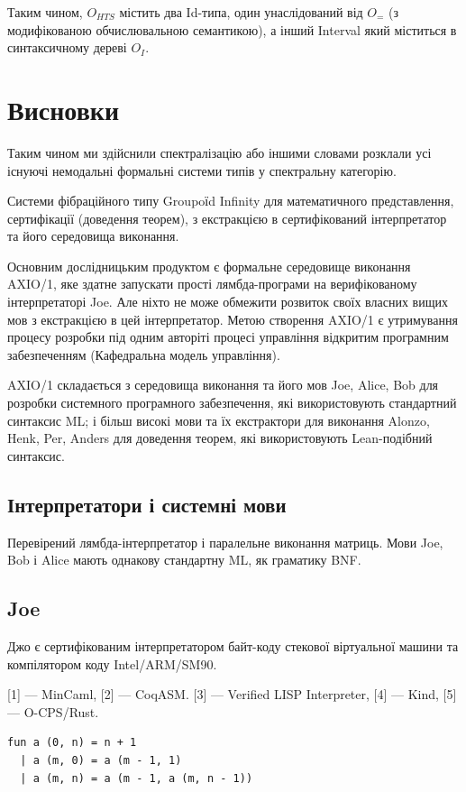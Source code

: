Таким чином,
$O_{HTS}$ містить два Id-типа, один унаслідований від $O_=$ (з модифікованою
обчислювальною семантикою), а інший Interval який міститься в синтаксичному дереві $O_I$.

\newpage
\section{Висновки}

Таким чином ми здійснили спектралізацію або іншими словами розклали усі
існуючі немодальні формальні системи типів у спектральну категорію.

Системи фібраційного типу Groupoїd Infinity для математичного представлення,
сертифікації (доведення теорем), з екстракцією в сертифікований інтерпретатор
та його середовища виконання.

Основним дослідницьким продуктом є формальне середовище виконання AXIO/1,
яке здатне запускати прості лямбда-програми на верифікованому інтерпретаторі Joe.
Але ніхто не може обмежити розвиток своїх власних вищих мов з екстракцією в цей інтерпретатор.
Метою створення AXIO/1 є утримування процесу розробки під одним авторіті процесі управління
відкритим програмним забезпеченням (Кафедральна модель управління).

AXIO/1 складається з середовища виконання та його мов Joe, Alice, Bob для розробки системного
програмного забезпечення, які використовують стандартний синтаксис ML; і більш високі
мови та їх екстрактори для виконання Alonzo, Henk, Per, Anders для доведення теорем,
які використовують Lean-подібний синтаксис.

\subsection*{Інтерпретатори і системні мови}

Перевірений лямбда-інтерпретатор і паралельне виконання матриць. Мови Joe,
Bob і Alice мають однакову стандартну ML, як граматику BNF.

\subsection*{Joe}

Джо є сертифікованим інтерпретатором байт-коду стекової віртуальної машини
та компілятором коду Intel/ARM/SM90.

[1] — MinCaml, [2] — CoqASM. [3] — Verified LISP Interpreter, [4] — Kind, [5] — O-CPS/Rust.

\begin{lstlisting}
fun a (0, n) = n + 1
  | a (m, 0) = a (m - 1, 1)
  | a (m, n) = a (m - 1, a (m, n - 1))
\end{lstlisting}

